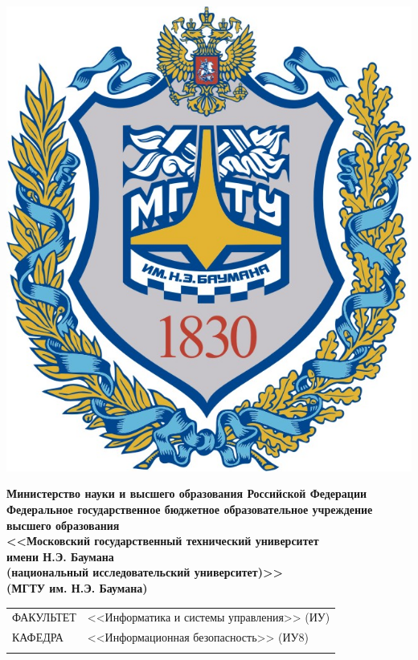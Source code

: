 \pagestyle{empty}
\noindent\begin{minipage}{0.05\textwidth}
    \includegraphics[scale=0.3]{bmstu}
\end{minipage}
\hfill
\begin{minipage}{0.85\textwidth}\raggedleft
    \begin{center}
        \fontsize{11pt}{0.3\baselineskip}\selectfont \textbf{Министерство науки и высшего образования Российской Федерации \\ Федеральное государственное бюджетное образовательное учреждение \\ высшего образования \\ <<Московский государственный технический университет \\ имени Н.Э. Баумана \\ (национальный исследовательский университет)>> \\ (МГТУ им. Н.Э. Баумана)}
    \end{center}
\end{minipage}
\begin{center}
    \fontsize{12pt}{0.1\baselineskip}\selectfont
    \noindent\makebox[\linewidth]{\rule{\textwidth}{2pt}} \makebox[\linewidth]{\rule{\textwidth}{1pt}}
\end{center}
\noindent
\begin{tabularx}{\textwidth}{lX}
    {\fontsize{12pt}{12pt}\selectfont ФАКУЛЬТЕТ}
                                               &
    {\fontsize{12pt}{12pt}\selectfont <<Информатика и системы управления>> (ИУ)} \\
    \hhline{~~}
    {\fontsize{12pt}{12pt}\selectfont КАФЕДРА} &
    {\fontsize{12pt}{12pt}\selectfont <<Информационная безопасность>> (ИУ8)}     \\
    \hhline{~~}
\end{tabularx}
\vfill

